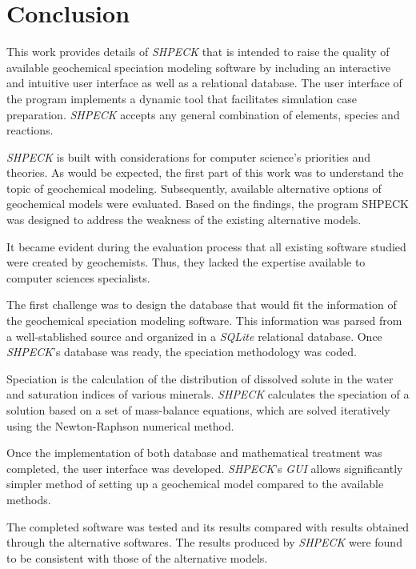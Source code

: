 
\chapter{Conclusion}
\label{chapter:conclusion}

This work provides details of \emph{SHPECK} that is intended to raise the quality of available geochemical speciation modeling software by including an interactive and intuitive user interface as well as a relational database. The user interface of the program implements a dynamic tool that facilitates simulation case preparation. \emph{SHPECK} accepts any general combination of elements, species and reactions.

\emph{SHPECK} is built with considerations for computer science's priorities and theories. As would be expected, the first part of this work was to understand the topic of geochemical modeling. Subsequently, available alternative options of geochemical models were evaluated. Based on the findings, the program SHPECK was designed to address the weakness of the existing alternative models. 

It became evident during the evaluation process that all existing software studied were created by geochemists. Thus, they lacked the expertise available to computer sciences specialists. 

The first challenge was to design the database that would fit the information of the geochemical speciation modeling software. This information was parsed from a well-stablished source and organized in a \emph{SQLite} relational database. Once \emph{SHPECK}'s database was ready, the speciation methodology was coded.

Speciation is the calculation of the distribution of dissolved solute in the water and saturation indices of various minerals. \emph{SHPECK} calculates the speciation of a solution based on a set of mass-balance equations, which are solved iteratively using the Newton-Raphson numerical method.

Once the implementation of both database and mathematical treatment was completed, the user interface was developed. \emph{SHPECK}'s \emph{GUI} allows significantly simpler method of setting up a geochemical model compared to the available methods.

The completed software was tested and its results compared with results obtained through the alternative softwares. 
The results produced by \emph{SHPECK} were found to be consistent with those of the alternative models.


